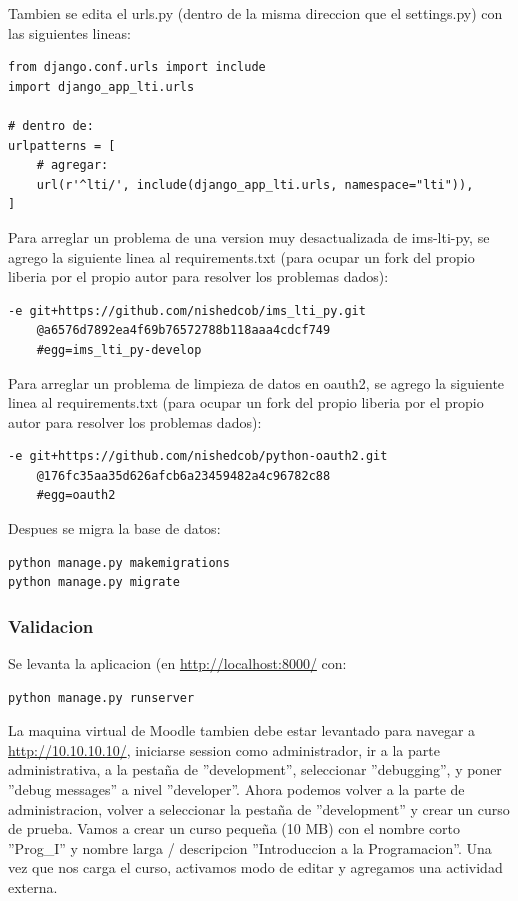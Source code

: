 Tambien se edita el urls.py (dentro de la misma direccion que el settings.py) con las siguientes lineas:
\begin{lstlisting}
from django.conf.urls import include
import django_app_lti.urls

# dentro de:
urlpatterns = [
    # agregar:
    url(r'^lti/', include(django_app_lti.urls, namespace="lti")),
]

\end{lstlisting}

\lstset{language=Bash}

Para arreglar un problema de una version muy desactualizada de ims-lti-py, se agrego la siguiente linea al requirements.txt (para ocupar un fork del propio liberia por el propio autor para resolver los problemas dados):
\begin{lstlisting}
-e git+https://github.com/nishedcob/ims_lti_py.git
    @a6576d7892ea4f69b76572788b118aaa4cdcf749
    #egg=ims_lti_py-develop
\end{lstlisting}

Para arreglar un problema de limpieza de datos en oauth2, se agrego la siguiente linea al requirements.txt (para ocupar un fork del propio liberia por el propio autor para resolver los problemas dados):
\begin{lstlisting}
-e git+https://github.com/nishedcob/python-oauth2.git
    @176fc35aa35d626afcb6a23459482a4c96782c88
    #egg=oauth2
\end{lstlisting}

Despues se migra la base de datos:
\begin{lstlisting}
python manage.py makemigrations
python manage.py migrate
\end{lstlisting}

\subsubsection{Validacion}

Se levanta la aplicacion (en \url{http://localhost:8000/} con:
\begin{lstlisting}
python manage.py runserver
\end{lstlisting}
La maquina virtual de Moodle tambien debe estar levantado para navegar a \url{http://10.10.10.10/}, iniciarse session como administrador, ir a la parte administrativa, a la pestaña de ''development'', seleccionar ''debugging'', y poner ''debug messages'' a nivel ''developer''. Ahora podemos volver a la parte de administracion, volver a seleccionar la pestaña de ''development'' y crear un curso de prueba. Vamos a crear un curso pequeña (10 MB) con el nombre corto ''Prog\_I'' y nombre larga / descripcion ''Introduccion a la Programacion''. Una vez que nos carga el curso, activamos modo de editar y agregamos una actividad externa.

